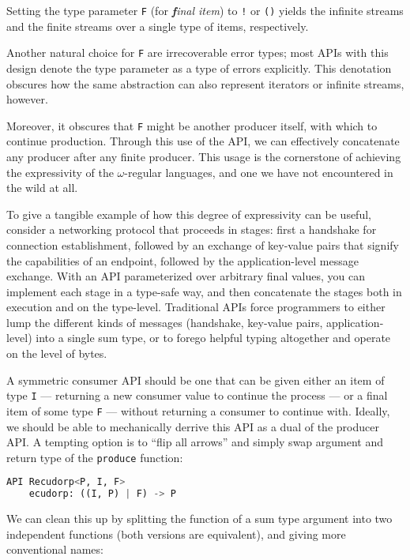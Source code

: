 \documentclass[sigplan,screen,10pt,anonymous,review]{acmart}
\begin{document}
Setting the type parameter \texttt{F} (for \textit{\textbf{f}inal item}) to \texttt{!} or \texttt{()} yields the infinite streams and the finite streams over a single type of items, respectively.

Another natural choice for \texttt{F} are irrecoverable error types; most APIs with this design denote the type parameter as a type of errors explicitly. This denotation obscures how the same abstraction can also represent iterators or infinite streams, however.

Moreover, it obscures that \texttt{F} might be another producer itself, with which to continue production. Through this use of the API, we can effectively concatenate any producer after any finite producer. This usage is the cornerstone of achieving the expressivity of the $\omega$-regular languages, and one we have not encountered in the wild at all.

To give a tangible example of how this degree of expressivity can be useful, consider a networking protocol that proceeds in stages: first a handshake for connection establishment, followed by an exchange of key-value pairs that signify the capabilities of an endpoint, followed by the application-level message exchange. With an API parameterized over arbitrary final values, you can implement each stage in a type-safe way, and then concatenate the stages both in execution and on the type-level. Traditional APIs force programmers to either lump the different kinds of messages (handshake, key-value pairs, application-level) into a single sum type, or to forego helpful typing altogether and operate on the level of bytes.

A symmetric consumer API should be one that can be given either an item of type \texttt{I} --- returning a new consumer value to continue the process --- or a final item of some type \texttt{F} --- without returning a consumer to continue with. Ideally, we should be able to mechanically derrive this API as a dual of the producer API. A tempting option is to ``flip all arrows'' and simply swap argument and return type of the \texttt{produce} function:

\begin{lstlisting}[language=Python]
API Recudorp<P, I, F>
    ecudorp: ((I, P) | F) -> P
\end{lstlisting}

We can clean this up by splitting the function of a sum type argument into two independent functions (both versions are equivalent), and giving more conventional names:
\end{document}
